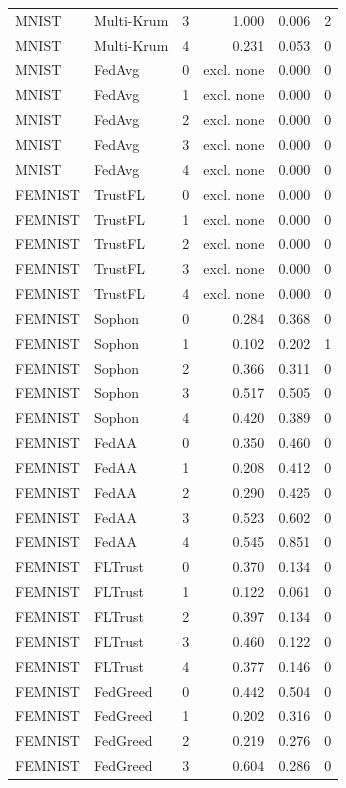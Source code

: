 \begin{tabular}{llrrrr}
MNIST & Multi-Krum & 3 & 1.000 & 0.006 & 2 \\
MNIST & Multi-Krum & 4 & 0.231 & 0.053 & 0 \\
MNIST & FedAvg & 0 & excl. none & 0.000 & 0 \\
MNIST & FedAvg & 1 & excl. none & 0.000 & 0 \\
MNIST & FedAvg & 2 & excl. none & 0.000 & 0 \\
MNIST & FedAvg & 3 & excl. none & 0.000 & 0 \\
MNIST & FedAvg & 4 & excl. none & 0.000 & 0 \\
FEMNIST & TrustFL & 0 & excl. none & 0.000 & 0 \\
FEMNIST & TrustFL & 1 & excl. none & 0.000 & 0 \\
FEMNIST & TrustFL & 2 & excl. none & 0.000 & 0 \\
FEMNIST & TrustFL & 3 & excl. none & 0.000 & 0 \\
FEMNIST & TrustFL & 4 & excl. none & 0.000 & 0 \\
FEMNIST & Sophon & 0 & 0.284 & 0.368 & 0 \\
FEMNIST & Sophon & 1 & 0.102 & 0.202 & 1 \\
FEMNIST & Sophon & 2 & 0.366 & 0.311 & 0 \\
FEMNIST & Sophon & 3 & 0.517 & 0.505 & 0 \\
FEMNIST & Sophon & 4 & 0.420 & 0.389 & 0 \\
FEMNIST & FedAA & 0 & 0.350 & 0.460 & 0 \\
FEMNIST & FedAA & 1 & 0.208 & 0.412 & 0 \\
FEMNIST & FedAA & 2 & 0.290 & 0.425 & 0 \\
FEMNIST & FedAA & 3 & 0.523 & 0.602 & 0 \\
FEMNIST & FedAA & 4 & 0.545 & 0.851 & 0 \\
FEMNIST & FLTrust & 0 & 0.370 & 0.134 & 0 \\
FEMNIST & FLTrust & 1 & 0.122 & 0.061 & 0 \\
FEMNIST & FLTrust & 2 & 0.397 & 0.134 & 0 \\
FEMNIST & FLTrust & 3 & 0.460 & 0.122 & 0 \\
FEMNIST & FLTrust & 4 & 0.377 & 0.146 & 0 \\
FEMNIST & FedGreed & 0 & 0.442 & 0.504 & 0 \\
FEMNIST & FedGreed & 1 & 0.202 & 0.316 & 0 \\
FEMNIST & FedGreed & 2 & 0.219 & 0.276 & 0 \\
FEMNIST & FedGreed & 3 & 0.604 & 0.286 & 0 \\

\end{tabular}

